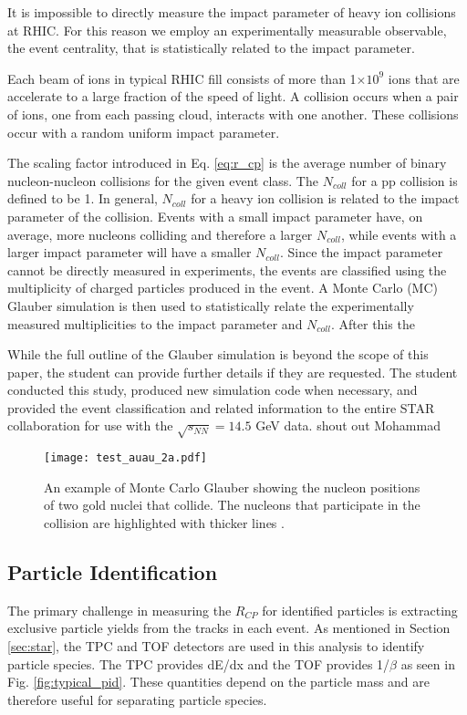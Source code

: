 	It is impossible to directly measure the impact parameter of heavy ion collisions at RHIC. For this reason we employ an experimentally measurable observable, the event centrality, that is statistically related to the impact parameter. 


	Each beam of ions in typical RHIC fill consists of more than 1$\times 10^9$ ions that are accelerate to a large fraction of the speed of light. A collision occurs when a pair of ions, one from each passing cloud, interacts with one another. These collisions occur with a random uniform impact parameter.

	The scaling factor introduced in Eq. \ref{eq:r_cp} is the average number of binary nucleon-nucleon collisions for the given event class. The $N_{coll}$ for a pp collision is defined to be 1. In general, $N_{coll}$ for a heavy ion collision is related to the impact parameter of the collision. Events with a small impact parameter have, on average, more nucleons colliding and therefore a larger $N_{coll}$, while events with a larger impact parameter will have a smaller $N_{coll}$. Since the impact parameter cannot be directly measured in experiments, the events are classified using the multiplicity of charged particles produced in the event. A Monte Carlo (MC) Glauber simulation is then used to statistically relate the experimentally measured multiplicities to the impact parameter and $N_{coll}$. After this the 

	While the full outline of the Glauber simulation is beyond the scope of this paper, the student can provide further details if they are requested. The student conducted this study, produced new simulation code when necessary, and provided the event classification and related information to the entire STAR collaboration for use with the $\sqrt{s_{NN}}=14.5$ GeV data. shout out Mohammad

	\begin{figure}[ht]
		\centering 
		
		\texttt{[image: test\_auau\_2a.pdf]} 
		\label{fig:glauber_auau} 

		\caption{ An example of Monte Carlo Glauber showing the nucleon positions of two gold nuclei that collide. The nucleons that participate in the collision are highlighted with thicker lines \cite{loizides_improved_2015-1}.  } 
	\end{figure}

\subsection{ Particle Identification}
	The primary challenge in measuring the $R_{CP}$ for identified particles is extracting exclusive particle yields from the tracks in each event. As mentioned in Section \ref{sec:star}, the TPC and TOF detectors are used in this analysis to identify particle species. The TPC provides dE/dx and the TOF provides 1/$\beta$ as seen in Fig. \ref{fig:typical_pid}. These quantities depend on the particle mass and are therefore useful for separating particle species. 

